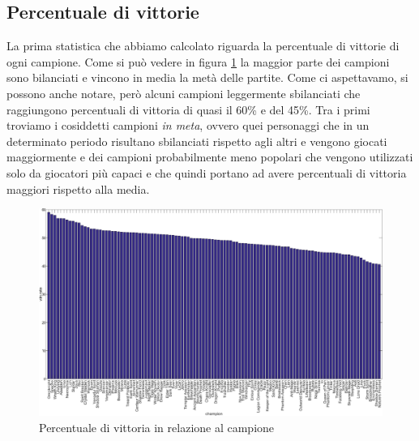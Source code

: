 \documentclass[a4paper,12pt,openany,oneside]{book}
\begin{document}
\subsection{Percentuale di vittorie}
La prima statistica che abbiamo calcolato riguarda la percentuale di vittorie di ogni campione. Come si può vedere in figura \ref{fig:win_rate} la maggior parte dei campioni sono bilanciati e vincono in media la metà delle partite. Come ci aspettavamo, si possono anche notare, però alcuni campioni leggermente sbilanciati che raggiungono percentuali di vittoria di quasi il 60\% e del 45\%. Tra i primi troviamo i cosiddetti campioni \textit{in meta}, ovvero quei personaggi che in un determinato periodo risultano sbilanciati rispetto agli altri e vengono giocati maggiormente e dei campioni probabilmente meno popolari che vengono utilizzati solo da giocatori più capaci e che quindi portano ad avere percentuali di vittoria maggiori rispetto alla media.
\begin{figure}[H]
	\includegraphics[width=\linewidth]{pics/win_rate.png}
	\caption{Percentuale di vittoria in relazione al campione}
	\label{fig:win_rate}
\end{figure}
\end{document}
